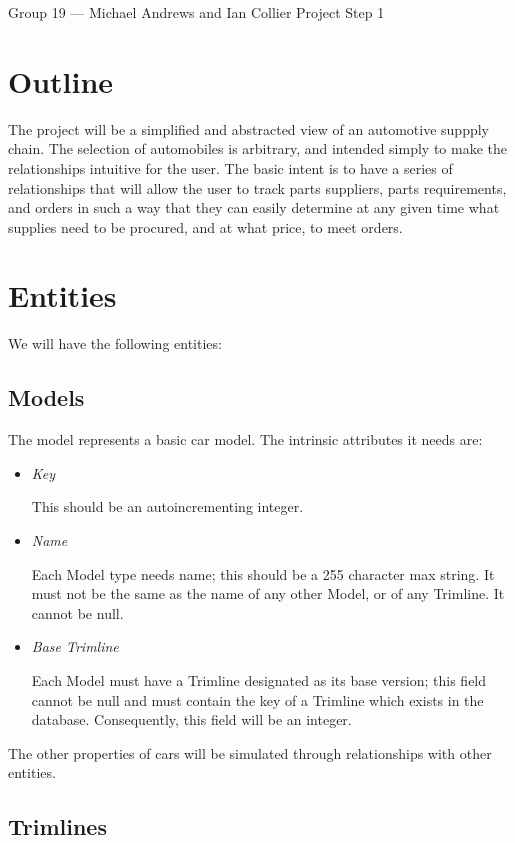 \documentclass[11pt,letterpaper,oneside]{amsart}
\begin{document}
Group 19 --- Michael Andrews and Ian Collier
Project Step 1

\section*{Outline}

The project will be a simplified and abstracted view of an automotive suppply chain.  The selection of automobiles is arbitrary, and intended simply to make the relationships intuitive for the user.  The basic intent is to have a series of relationships that will allow the user to track parts suppliers, parts requirements, and orders in such a way that they can easily determine at any given time what supplies need to be procured, and at what price, to meet orders.

\section*{Entities}

We will have the following entities:

\subsection*{Models}
The model represents a basic car model.  The intrinsic attributes it needs are:
\begin{itemize}
	\item \emph{Key}
	
	This should be an autoincrementing integer.	
	
	\item \emph{Name}
	
	Each Model type needs name; this should be a 255 character max string.  It must not be the same as the name of any other Model, or of any Trimline.  It cannot be null.
	
	\item \emph{Base Trimline}
	
	Each Model must have a Trimline designated as its base version; this field cannot be null and must contain the key of a Trimline which exists in the database.  Consequently, this field will be an integer.
	
	
\end{itemize}

The other properties of cars will be simulated through relationships with other entities.

\subsection*{Trimlines}
\end{document}
